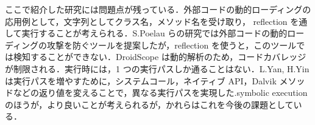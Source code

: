 ここで紹介した研究には問題点が残っている．外部コードの動的ローディングの応用例として，文字列としてクラス名，メソッド名を受け取り，  reflection を通して実行することが考えられる．S.Poelau らの研究では外部コードの動的ローディングの攻撃を防ぐツールを提案したが，reflection を使うと，このツールでは検知することができない．DroidScope は動的解析のため，コードカバレッジが制限される．実行時には，1 つの実行パスしか通ることはない．L.Yan, H.Yin は実行パスを増やすために，システムコール，ネイティブ API，Dalvik メソッドなどの返り値を変えることで，異なる実行パスを実現した.symbolic execution のほうが，より良いことが考えられるが，かれらはこれを今後の課題としている．


